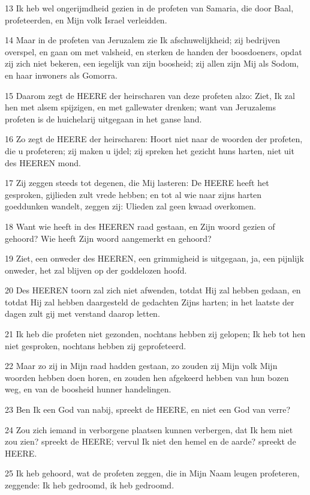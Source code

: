 \par 13 Ik heb wel ongerijmdheid gezien in de profeten van Samaria, die door Baal, profeteerden, en Mijn volk Israel verleidden.
\par 14 Maar in de profeten van Jeruzalem zie Ik afschuwelijkheid; zij bedrijven overspel, en gaan om met valsheid, en sterken de handen der boosdoeners, opdat zij zich niet bekeren, een iegelijk van zijn boosheid; zij allen zijn Mij als Sodom, en haar inwoners als Gomorra.
\par 15 Daarom zegt de HEERE der heirscharen van deze profeten alzo: Ziet, Ik zal hen met alsem spijzigen, en met gallewater drenken; want van Jeruzalems profeten is de huichelarij uitgegaan in het ganse land.
\par 16 Zo zegt de HEERE der heirscharen: Hoort niet naar de woorden der profeten, die u profeteren; zij maken u ijdel; zij spreken het gezicht huns harten, niet uit des HEEREN mond.
\par 17 Zij zeggen steeds tot degenen, die Mij lasteren: De HEERE heeft het gesproken, gijlieden zult vrede hebben; en tot al wie naar zijns harten goeddunken wandelt, zeggen zij: Ulieden zal geen kwaad overkomen.
\par 18 Want wie heeft in des HEEREN raad gestaan, en Zijn woord gezien of gehoord? Wie heeft Zijn woord aangemerkt en gehoord?
\par 19 Ziet, een onweder des HEEREN, een grimmigheid is uitgegaan, ja, een pijnlijk onweder, het zal blijven op der goddelozen hoofd.
\par 20 Des HEEREN toorn zal zich niet afwenden, totdat Hij zal hebben gedaan, en totdat Hij zal hebben daargesteld de gedachten Zijns harten; in het laatste der dagen zult gij met verstand daarop letten.
\par 21 Ik heb die profeten niet gezonden, nochtans hebben zij gelopen; Ik heb tot hen niet gesproken, nochtans hebben zij geprofeteerd.
\par 22 Maar zo zij in Mijn raad hadden gestaan, zo zouden zij Mijn volk Mijn woorden hebben doen horen, en zouden hen afgekeerd hebben van hun bozen weg, en van de boosheid hunner handelingen.
\par 23 Ben Ik een God van nabij, spreekt de HEERE, en niet een God van verre?
\par 24 Zou zich iemand in verborgene plaatsen kunnen verbergen, dat Ik hem niet zou zien? spreekt de HEERE; vervul Ik niet den hemel en de aarde? spreekt de HEERE.
\par 25 Ik heb gehoord, wat de profeten zeggen, die in Mijn Naam leugen profeteren, zeggende: Ik heb gedroomd, ik heb gedroomd.
